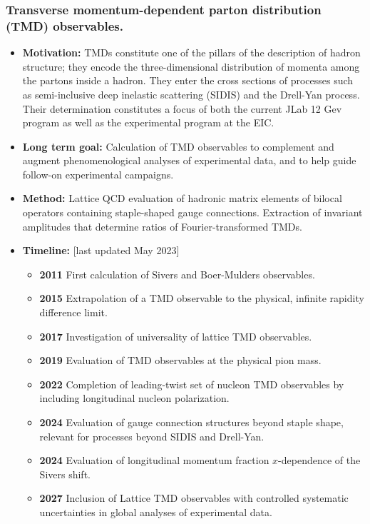 \documentclass[12pt,hyperpdf]{article}
\begin{document}
\subsubsection{Transverse momentum-dependent parton distribution
(TMD) observables.}
\begin{itemize}
\item{\bf Motivation:} TMDs constitute one of the pillars of the description
of hadron structure; they encode the three-dimensional distribution of
momenta among the partons inside a hadron. They enter the cross sections
of processes such as semi-inclusive deep inelastic scattering (SIDIS) and
the Drell-Yan process. Their determination constitutes a focus of both the
current JLab 12 Gev program as well as the experimental program at the EIC.
\item{\bf Long term goal:} Calculation of TMD observables to
complement and augment phenomenological analyses of experimental data,
and to help guide follow-on experimental campaigns.
\item{\bf Method:} Lattice QCD evaluation of hadronic matrix elements of
bilocal operators containing staple-shaped gauge connections. Extraction
of invariant amplitudes that determine ratios of Fourier-transformed TMDs.
\item{\bf Timeline:} \hfill [last updated May 2023]
\begin{itemize}
\item{\bf 2011} First calculation of Sivers and Boer-Mulders observables.
\item{\bf 2015} Extrapolation of a TMD observable to the physical, infinite
rapidity difference limit.
\item{\bf 2017} Investigation of universality of lattice TMD observables.
\item{\bf 2019} Evaluation of TMD observables at the physical pion mass.
\item{\bf 2022} Completion of leading-twist set of nucleon TMD observables by
including longitudinal nucleon polarization.
\item{\bf 2024} Evaluation of gauge connection structures beyond staple shape,
relevant for processes beyond SIDIS and Drell-Yan.
\item{\bf 2024} Evaluation of longitudinal momentum fraction $x$-dependence
of the Sivers shift.
\item{\bf 2027} Inclusion of Lattice TMD observables with controlled systematic
uncertainties in global analyses of experimental data.
\end{itemize}
\end{itemize}
\end{document}
